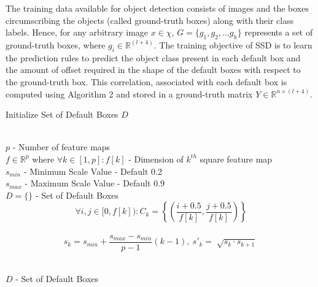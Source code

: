 \documentclass[conference]{IEEEtran}
\begin{document}
The training data available for object detection consists of images and the boxes circumscribing the objects (called ground-truth boxes) along with their class labels. Hence, for any arbitrary image $x \in \chi$, $G = \{g_1, g_2, ... g_h\}$ represents a set of ground-truth boxes, where $g_i \in \mathbb{R}^{(l+4)}$. The training objective of SSD is to learn the prediction rules to predict the object class present in each default box and the amount of offset required in the shape of the default boxes with respect to the ground-truth box. This correlation, associated with each default box is computed using Algorithm 2 and stored in a ground-truth matrix $Y \in \mathbb{R}^{n \times (l + 4)}$.

\begin{algorithm}
   \caption{Initialize Set of Default Boxes $D$}
   \label{alg1}
\begin{algorithmic}
   		\\$p$ - Number of feature maps
        \\$f \in \mathbb{R}^p$ where $\forall k \in [1,p] : f[k]$ - Dimension of $k^{th}$ square feature map
        \\$s_{min}$ - Minimum Scale Value - Default 0.2
        \\$s_{max}$ - Maximum Scale Value - Default 0.9
    	\\$D = \{\}$ - Set of Default Boxes
              	\\$$\ \forall i,j \in [0, f[k]): C_k = \left\{\left(\frac{i + 0.5}{f[k]}, \frac{j + 0.5}{f[k]}\right)\right\}$$
          		\\$$s_k = s_{min} + \frac{s_{max} - s_{min}}{p - 1}(k - 1),\ s'_k = \sqrt[]{s_k \cdot s_{k+1}}$$
            \ENDFOR
              
       \ENDFOR
		\\$D$ - Set of Default Boxes
            
\end{algorithmic}
\end{algorithm}
\end{document}
